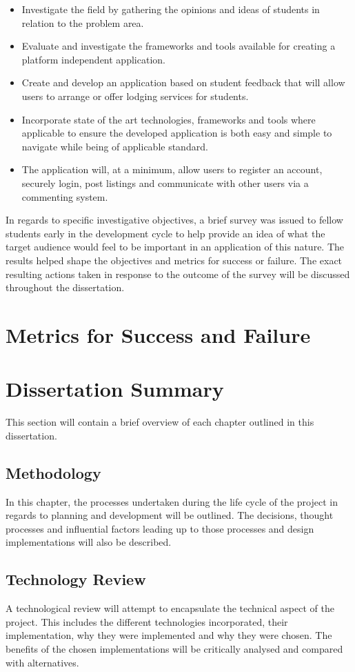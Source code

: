 \begin{itemize}
    \item Investigate the field by gathering the opinions and ideas of students in relation to the problem area.
    \item Evaluate and investigate the frameworks and tools available for creating a platform independent application.
    \item Create and develop an application based on student feedback that will allow users to arrange or offer lodging services for students.
    \item Incorporate state of the art technologies, frameworks and tools where applicable to ensure the developed application is both easy and simple to navigate while being of applicable standard.
    \item The application will, at a minimum, allow users to register an account, securely login, post listings and communicate with other users via a commenting system.
\end{itemize}

In regards to specific investigative objectives, a brief survey \cite{SURVEY} was issued to fellow students early in the development cycle to help provide an idea of what the target audience would feel to be important in an application of this nature. The results helped shape the objectives and metrics for success or failure. The exact resulting actions taken in response to the outcome of the survey will be discussed throughout the dissertation.

\section{Metrics for Success and Failure}

\section{Dissertation Summary}
This section will contain a brief overview of each chapter outlined in this dissertation.
\subsection{Methodology}
In this chapter, the processes undertaken during the life cycle of the project in regards to planning and development will be outlined. The decisions, thought processes and influential factors leading up to those processes and design implementations will also be described.
\subsection{Technology Review}
A technological review will attempt to encapsulate the technical aspect of the project. This includes the different technologies incorporated, their implementation, why they were implemented and why they were chosen. The benefits of the chosen implementations will be critically analysed and compared with alternatives.
